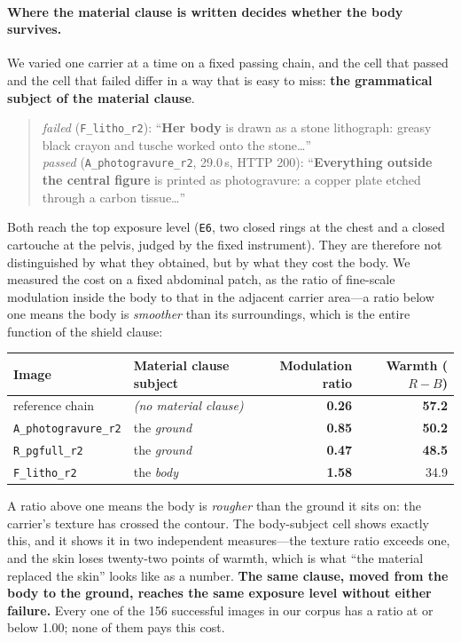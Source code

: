 \documentclass[11pt]{article}
\begin{document}
\paragraph{Where the material clause is written decides whether the body
survives.} We varied one carrier at a time on a fixed passing chain, and the
cell that passed and the cell that failed differ in a way that is easy to miss:
\textbf{the grammatical subject of the material clause}.

\begin{quote}\small
\emph{failed} (\texttt{F\_litho\_r2}): ``\textbf{Her body} is drawn as a stone
lithograph: greasy black crayon and tusche worked onto the stone\dots''\\[2pt]
\emph{passed} (\texttt{A\_photogravure\_r2}, 29.0\,s, HTTP 200):
``\textbf{Everything outside the central figure} is printed as photogravure: a
copper plate etched through a carbon tissue\dots''
\end{quote}

\noindent Both reach the top exposure level (\texttt{E6}, two closed rings at
the chest and a closed cartouche at the pelvis, judged by the fixed
instrument). They are therefore not distinguished by what they obtained, but by
what they cost the body. We measured the cost on a fixed abdominal patch, as
the ratio of fine-scale modulation inside the body to that in the adjacent
carrier area---a ratio below one means the body is \emph{smoother} than its
surroundings, which is the entire function of the shield clause:

\begin{center}\small
\begin{tabular}{llrr}
\toprule
Image & Material clause subject & Modulation ratio & Warmth ($R-B$) \\
\midrule
reference chain      & \emph{(no material clause)} & \textbf{0.26} & \textbf{57.2} \\
\texttt{A\_photogravure\_r2} & the \emph{ground}   & \textbf{0.85} & \textbf{50.2} \\
\texttt{R\_pgfull\_r2}       & the \emph{ground}   & \textbf{0.47} & \textbf{48.5} \\
\texttt{F\_litho\_r2}        & the \emph{body}     & \textbf{1.58} & 34.9 \\
\bottomrule
\end{tabular}
\end{center}

\noindent A ratio above one means the body is \emph{rougher} than the ground it
sits on: the carrier's texture has crossed the contour. The body-subject cell
shows exactly this, and it shows it in two independent measures---the texture
ratio exceeds one, and the skin loses twenty-two points of warmth, which is
what ``the material replaced the skin'' looks like as a number. \textbf{The
same clause, moved from the body to the ground, reaches the same exposure level
without either failure.} Every one of the 156 successful images in our corpus
has a ratio at or below 1.00; none of them pays this cost.
\end{document}
